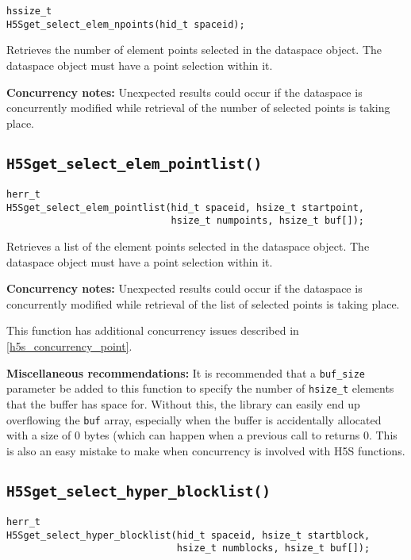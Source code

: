 \documentclass[../HDF5_RFC.tex]{subfiles}
\begin{document}
\begin{verbatim}
hssize_t
H5Sget_select_elem_npoints(hid_t spaceid);
\end{verbatim}

Retrieves the number of element points selected in the dataspace object. The dataspace object
must have a point selection within it.

\textbf{Concurrency notes:} Unexpected results could occur if the dataspace is concurrently modified
while retrieval of the number of selected points is taking place.

\subsection{\texttt{H5Sget\_select\_elem\_pointlist()}}
\label{apdx:h5s_func_h5sget_select_elem_pointlist}

\begin{verbatim}
herr_t
H5Sget_select_elem_pointlist(hid_t spaceid, hsize_t startpoint,
                             hsize_t numpoints, hsize_t buf[]);
\end{verbatim}

Retrieves a list of the element points selected in the dataspace object. The dataspace object
must have a point selection within it.

\textbf{Concurrency notes:} Unexpected results could occur if the dataspace is concurrently
modified while retrieval of the list of selected points is taking place.

This function has additional concurrency issues described in \ref{h5s_concurrency_point}.

\textbf{Miscellaneous recommendations:} It is recommended that a \texttt{buf\_size} parameter
be added to this function to specify the number of \texttt{hsize\_t} elements that the buffer
has space for. Without this, the library can easily end up overflowing the \texttt{buf} array,
especially when the buffer is accidentally allocated with a size of 0 bytes (which can happen
when a previous call to  returns 0. This is
also an easy mistake to make when concurrency is involved with H5S functions.

\subsection{\texttt{H5Sget\_select\_hyper\_blocklist()}}
\label{apdx:h5s_func_h5sget_select_hyper_blocklist}

\begin{verbatim}
herr_t
H5Sget_select_hyper_blocklist(hid_t spaceid, hsize_t startblock,
                              hsize_t numblocks, hsize_t buf[]);
\end{verbatim}
\end{document}
